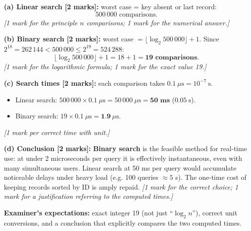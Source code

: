 \documentclass[11pt]{article}
\begin{document}
\begin{corrige}
\textbf{(a) Linear search [2 marks]:} worst case = key absent or last record:
\[ 500\,000 \text{ comparisons.} \]
\emph{[1 mark for the principle $n$ comparisons; 1 mark for the numerical answer.]}

\textbf{(b) Binary search [2 marks]:} worst case $= \lfloor \log_2 500\,000 \rfloor + 1$. Since $2^{18} = 262\,144 < 500\,000 \leq 2^{19} = 524\,288$:
\[ \lfloor \log_2 500\,000 \rfloor + 1 = 18 + 1 = \textbf{19 comparisons.} \]
\emph{[1 mark for the logarithmic formula; 1 mark for the exact value 19.]}

\textbf{(c) Search times [2 marks]:} each comparison takes $0.1\ \mu\mathrm{s} = 10^{-7}\ \mathrm{s}$.
\begin{itemize}
\item Linear search: $500\,000 \times 0.1\ \mu\mathrm{s} = 50\,000\ \mu\mathrm{s} = \textbf{50 ms}$ ($0.05\ \mathrm{s}$).
\item Binary search: $19 \times 0.1\ \mu\mathrm{s} = \textbf{1.9}\ \mu\mathrm{s}$.
\end{itemize}
\emph{[1 mark per correct time with unit.]}

\textbf{(d) Conclusion [2 marks]:} \textbf{Binary search} is the feasible method for real-time use: at under 2 microseconds per query it is effectively instantaneous, even with many simultaneous users. Linear search at 50 ms per query would accumulate noticeable delays under heavy load (e.g. 100 queries $\approx 5$ s). The one-time cost of keeping records sorted by ID is amply repaid.
\emph{[1 mark for the correct choice; 1 mark for a justification referring to the computed times.]}

\textbf{Examiner's expectations:} exact integer 19 (not just ``$\log_2 n$''), correct unit conversions, and a conclusion that explicitly compares the two computed times.
\end{corrige}
\end{document}
